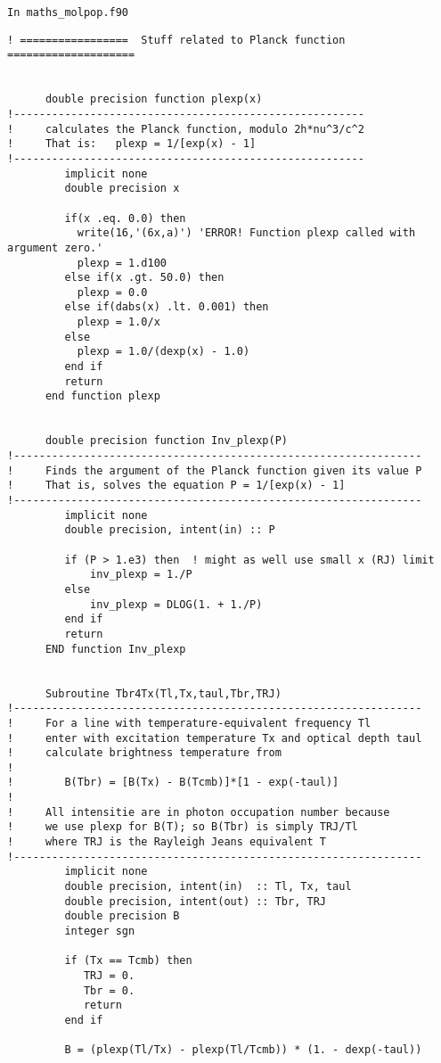 \documentclass[preprint,12pt]{aastex}
\begin{document}
\centerline{\tt In maths\_molpop.f90}
\begin{verbatim}
! =================  Stuff related to Planck function  ====================


      double precision function plexp(x)
!-------------------------------------------------------
!     calculates the Planck function, modulo 2h*nu^3/c^2
!     That is:   plexp = 1/[exp(x) - 1]
!-------------------------------------------------------
         implicit none
         double precision x

         if(x .eq. 0.0) then
           write(16,'(6x,a)') 'ERROR! Function plexp called with argument zero.'
           plexp = 1.d100
         else if(x .gt. 50.0) then
           plexp = 0.0
         else if(dabs(x) .lt. 0.001) then
           plexp = 1.0/x
         else
           plexp = 1.0/(dexp(x) - 1.0)
         end if
         return
      end function plexp


      double precision function Inv_plexp(P)
!----------------------------------------------------------------
!     Finds the argument of the Planck function given its value P
!     That is, solves the equation P = 1/[exp(x) - 1]
!----------------------------------------------------------------
         implicit none
         double precision, intent(in) :: P

         if (P > 1.e3) then  ! might as well use small x (RJ) limit
             inv_plexp = 1./P
         else
             inv_plexp = DLOG(1. + 1./P)
         end if
         return
      END function Inv_plexp


      Subroutine Tbr4Tx(Tl,Tx,taul,Tbr,TRJ)
!----------------------------------------------------------------
!     For a line with temperature-equivalent frequency Tl
!     enter with excitation temperature Tx and optical depth taul
!     calculate brightness temperature from
!
!        B(Tbr) = [B(Tx) - B(Tcmb)]*[1 - exp(-taul)]
!
!     All intensitie are in photon occupation number because
!     we use plexp for B(T); so B(Tbr) is simply TRJ/Tl
!     where TRJ is the Rayleigh Jeans equivalent T
!----------------------------------------------------------------
         implicit none
         double precision, intent(in)  :: Tl, Tx, taul
         double precision, intent(out) :: Tbr, TRJ
         double precision B
         integer sgn

         if (Tx == Tcmb) then
            TRJ = 0.
            Tbr = 0.
            return
         end if

         B = (plexp(Tl/Tx) - plexp(Tl/Tcmb)) * (1. - dexp(-taul))


\end{verbatim}
\end{document}
